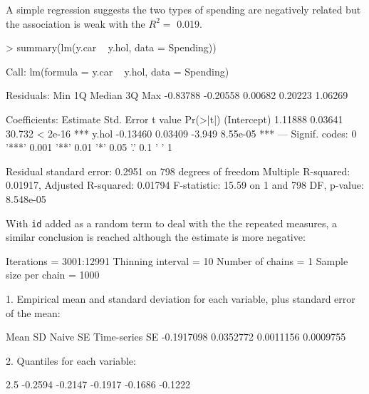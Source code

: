 \documentclass{article}
\begin{document}
A simple regression suggests the two types of spending are negatively related but the association is weak with the $R^{2}=$ 0.019.

\begin{Schunk}
\begin{Sinput}
> summary(lm(y.car ~ y.hol, data = Spending))
\end{Sinput}
\begin{Soutput}
Call:
lm(formula = y.car ~ y.hol, data = Spending)

Residuals:
     Min       1Q   Median       3Q      Max 
-0.83788 -0.20558  0.00682  0.20223  1.06269 

Coefficients:
            Estimate Std. Error t value Pr(>|t|)    
(Intercept)  1.11888    0.03641  30.732  < 2e-16 ***
y.hol       -0.13460    0.03409  -3.949 8.55e-05 ***
---
Signif. codes:  0 '***' 0.001 '**' 0.01 '*' 0.05 '.' 0.1 ' ' 1 

Residual standard error: 0.2951 on 798 degrees of freedom
Multiple R-squared: 0.01917,	Adjusted R-squared: 0.01794 
F-statistic: 15.59 on 1 and 798 DF,  p-value: 8.548e-05 
\end{Soutput}
\end{Schunk}

With \texttt{id} added as a random term to deal with the the repeated measures, a similar conclusion is reached although the estimate is more negative:

\iftalk
\else
\fi

\begin{Schunk}
\begin{Soutput}
Iterations = 3001:12991
Thinning interval = 10 
Number of chains = 1 
Sample size per chain = 1000 

1. Empirical mean and standard deviation for each variable,
   plus standard error of the mean:

          Mean             SD       Naive SE Time-series SE 
    -0.1917098      0.0352772      0.0011156      0.0009755 

2. Quantiles for each variable:

   2.5%
-0.2594 -0.2147 -0.1917 -0.1686 -0.1222 
\end{Soutput}
\end{Schunk}
\end{document}
